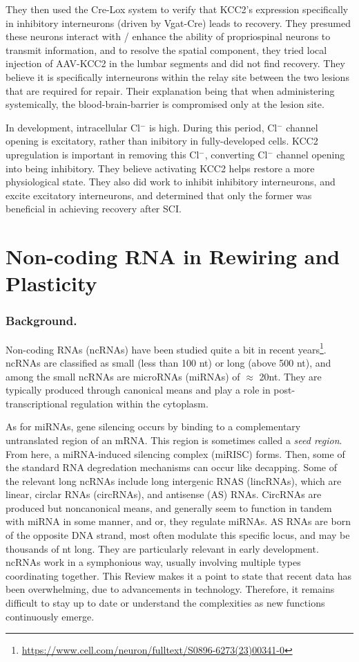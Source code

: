 \documentclass[12pt]{report}
\begin{document}
They then used the Cre-Lox system to verify that KCC2's expression specifically in inhibitory interneurons (driven by Vgat-Cre) leads to recovery. They presumed these neurons interact with / enhance the ability of propriospinal neurons to transmit information, and to resolve the spatial component, they tried local injection of AAV-KCC2 in the lumbar segments and did not find recovery. They believe it is specifically interneurons within the relay site between the two lesions that are required for repair. Their explanation being that when administering systemically, the blood-brain-barrier is compromised only at the lesion site.\newline

In development, intracellular Cl$^-$ is high. During this period, Cl$^-$ channel opening is excitatory, rather than inibitory in fully-developed cells. KCC2 upregulation is important in removing this Cl$^-$, converting Cl$^-$ channel opening into being inhibitory. They believe activating KCC2 helps restore a more physiological state. They also did work to inhibit inhibitory interneurons, and excite excitatory interneurons, and determined that only the former was beneficial in achieving recovery after SCI. 


\section{Non-coding RNA in Rewiring and Plasticity}

\subsubsection{Background.}

Non-coding RNAs (ncRNAs) have been studied quite a bit in recent years\footnote{\url{https://www.cell.com/neuron/fulltext/S0896-6273(23)00341-0}}. ncRNAs are classified as small (less than 100 nt) or long (above 500 nt), and among the small ncRNAs are microRNAs (miRNAs) of $\approx$ 20nt. They are typically produced through canonical means and play a role in post-transcriptional regulation within the cytoplasm.\newline

As for miRNAs, gene silencing occurs by binding to a complementary untranslated region of an mRNA. This region is sometimes called a \textit{seed region}. From here, a miRNA-induced silencing complex (miRISC) forms. Then, some of the standard RNA degredation mechanisms can occur like decapping. Some of the relevant long ncRNAs include long intergenic RNAS (lincRNAs), which are linear, circlar RNAs (circRNAs), and antisense (AS) RNAs. CircRNAs are produced but noncanonical means, and generally seem to function in tandem with miRNA in some manner, and or, they regulate miRNAs. AS RNAs are born of the opposite DNA strand, most often modulate this specific locus, and may be thousands of nt long. They are particularly relevant in early development. ncRNAs work in a symphonious way, usually involving multiple types coordinating together. This Review makes it a point to state that recent data has been overwhelming, due to advancements in technology. Therefore, it remains difficult to stay up to date or understand the complexities as new functions continuously emerge.
\end{document}

